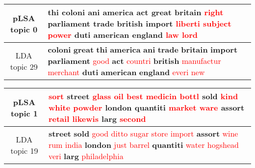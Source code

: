 \begin{center}\begin{tabularx}{\textwidth} {
  | c | >{\raggedright\arraybackslash}X | } \hline 
pLSA topic 0 & \textbf{thi} \textbf{coloni} \textbf{ani} \textbf{america} \textbf{act} \textbf{great} \textbf{britain} \textcolor{red}{right} \textbf{parliament} \textbf{trade} \textbf{british} \textbf{import} \textcolor{red}{liberti} \textcolor{red}{subject} \textcolor{red}{power} \textbf{duti} \textbf{american} \textbf{england} \textcolor{red}{law} \textcolor{red}{lord} \\ \hline 
LDA topic 29 & \textbf{coloni} \textbf{great} \textbf{thi} \textbf{america} \textbf{ani} \textbf{trade} \textbf{britain} \textbf{import} \textbf{parliament} \textcolor{red}{good} \textbf{act} \textcolor{red}{countri} \textbf{british} \textcolor{red}{manufactur} \textcolor{red}{merchant} \textbf{duti} \textbf{american} \textbf{england} \textcolor{red}{everi} \textcolor{red}{new} \\ \hline 
\end{tabularx}

\end{center}

\begin{center}\begin{tabularx}{\textwidth} {
  | c | >{\raggedright\arraybackslash}X | } \hline 
pLSA topic 1 & \textcolor{red}{sort} \textbf{street} \textcolor{red}{glass} \textcolor{red}{oil} \textcolor{red}{best} \textcolor{red}{medicin} \textcolor{red}{bottl} \textbf{sold} \textcolor{red}{kind} \textcolor{red}{white} \textcolor{red}{powder} \textbf{london} \textbf{quantiti} \textcolor{red}{market} \textcolor{red}{ware} \textbf{assort} \textcolor{red}{retail} \textcolor{red}{likewis} \textbf{larg} \textcolor{red}{second} \\ \hline 
LDA topic 19 & \textbf{street} \textbf{sold} \textcolor{red}{good} \textcolor{red}{ditto} \textcolor{red}{sugar} \textcolor{red}{store} \textcolor{red}{import} \textbf{assort} \textcolor{red}{wine} \textcolor{red}{rum} \textcolor{red}{india} \textbf{london} \textcolor{red}{just} \textcolor{red}{barrel} \textbf{quantiti} \textcolor{red}{water} \textcolor{red}{hogshead} \textcolor{red}{veri} \textbf{larg} \textcolor{red}{philadelphia} \\ \hline 
\end{tabularx}

\end{center}

